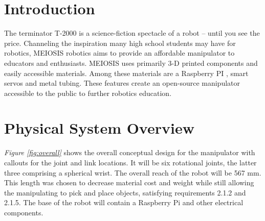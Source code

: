\documentclass[12pt]{report}
\begin{document}
\normalem

{\tableofcontents\let\clearpage\relax\listoffigures\let\clearpage\relax\listoftables}
\clearpage
\newpage



\onehalfspacing
\section{Introduction}
The terminator T-2000 is a science-fiction spectacle of a robot -- until you see the price. Channeling the inspiration many high school students may have for robotics, MEIOSIS robotics aims to provide an affordable manipulator to educators and enthusiasts. MEIOSIS uses primarily 3-D printed components and easily accessible materials. Among these materials are a Raspberry PI , smart servos and metal tubing. These features create an open-source manipulator accessible to the public to further robotics education.
\section{Physical System Overview}
\emph{Figure \ref{fig:overall}} shows the overall conceptual design for the manipulator with callouts for the joint and link locations. It will be six rotational joints, the latter three comprising a spherical wrist. The overall reach of the robot will be 567 mm. This length was chosen to decrease material cost and weight while still allowing the manipulating to pick and place objects, satisfying requirements 2.1.2 and 2.1.5. The base of the robot will contain a Raspberry Pi and other electrical components.
\end{document}
